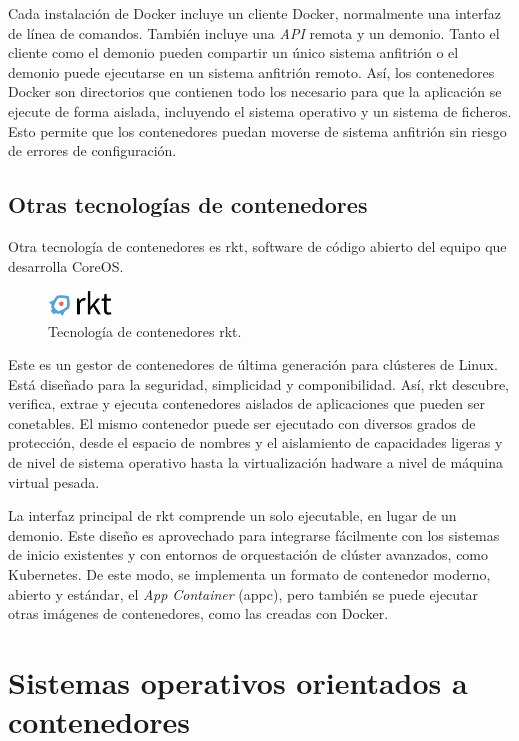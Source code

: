 Cada instalación de Docker incluye un cliente Docker, normalmente una interfaz de línea de comandos. También incluye una \textit{API} remota y un demonio. Tanto el cliente como el demonio pueden compartir un único sistema anfitrión o el demonio puede ejecutarse en un sistema anfitrión remoto. Así, los contenedores Docker son directorios que contienen todo los necesario para que la aplicación se ejecute de forma aislada, incluyendo el sistema operativo y un sistema de ficheros. Esto permite que los contenedores puedan moverse de sistema anfitrión sin riesgo de errores de configuración.

\subsection{Otras tecnologías de contenedores}

Otra tecnología de contenedores es rkt, software de código abierto del equipo que desarrolla CoreOS. 

\begin{figure}[H]
\centering
\includegraphics[width=0.15\textwidth]{images/figures/rkt.png}
\caption{Tecnología de contenedores rkt.\label{fig:figure_placement_example}}
\end{figure}

Este es un gestor de contenedores de última generación para clústeres de Linux. Está diseñado para la seguridad, simplicidad y componibilidad. Así, rkt descubre, verifica, extrae y ejecuta contenedores aislados de aplicaciones que pueden ser conetables. El mismo contenedor puede ser ejecutado con diversos grados de protección, desde el espacio de nombres y el aislamiento de capacidades ligeras y de nivel de sistema operativo hasta la virtualización hadware a nivel de máquina virtual pesada.

La interfaz principal de rkt comprende un solo ejecutable, en lugar de un demonio. Este diseño es aprovechado para integrarse fácilmente con los sistemas de inicio existentes y con entornos de orquestación de clúster avanzados, como Kubernetes. De este modo, se implementa un formato de contenedor moderno, abierto y estándar, el \textit{App Container} (appc), pero también se puede ejecutar otras imágenes de contenedores, como las creadas con Docker.

\section{Sistemas operativos orientados a contenedores}


